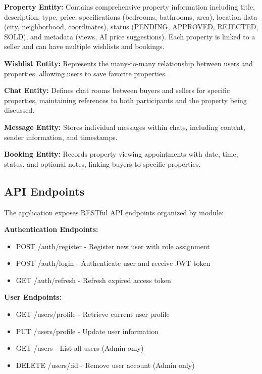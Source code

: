 \textbf{Property Entity:} Contains comprehensive property information including title, description, type, price, specifications (bedrooms, bathrooms, area), location data (city, neighborhood, coordinates), status (PENDING, APPROVED, REJECTED, SOLD), and metadata (views, AI price suggestions). Each property is linked to a seller and can have multiple wishlists and bookings.

\textbf{Wishlist Entity:} Represents the many-to-many relationship between users and properties, allowing users to save favorite properties.

\textbf{Chat Entity:} Defines chat rooms between buyers and sellers for specific properties, maintaining references to both participants and the property being discussed.

\textbf{Message Entity:} Stores individual messages within chats, including content, sender information, and timestamps.

\textbf{Booking Entity:} Records property viewing appointments with date, time, status, and optional notes, linking buyers to specific properties.

\subsection{API Endpoints}

The application exposes RESTful API endpoints organized by module:

\textbf{Authentication Endpoints:}
\begin{itemize}
    \item POST /auth/register - Register new user with role assignment
    \item POST /auth/login - Authenticate user and receive JWT token
    \item GET /auth/refresh - Refresh expired access token
\end{itemize}

\textbf{User Endpoints:}
\begin{itemize}
    \item GET /users/profile - Retrieve current user profile
    \item PUT /users/profile - Update user information
    \item GET /users - List all users (Admin only)
    \item DELETE /users/:id - Remove user account (Admin only)
\end{itemize}

